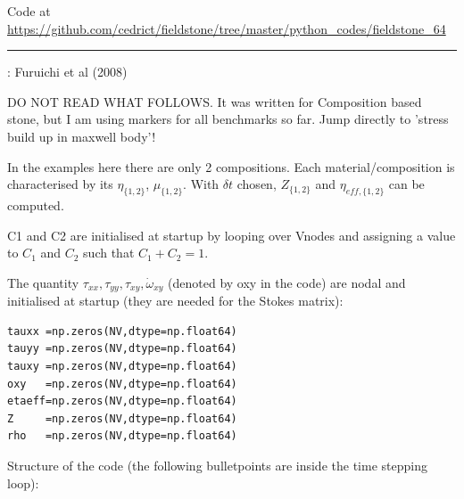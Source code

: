 

\begin{center}
Code at \url{https://github.com/cedrict/fieldstone/tree/master/python_codes/fieldstone_64}
\end{center}

\par\noindent\rule{\textwidth}{0.4pt}

\Literature: Furuichi et al (2008) \cite{fukk08}



{\large
DO NOT READ WHAT FOLLOWS. It was written for Composition based stone, but I am using 
markers for all benchmarks so far. Jump directly to 'stress build up in maxwell body'! 
}

In the examples here there are only 2 compositions. 
Each material/composition is characterised by its $\eta_{\{1,2\}}$, $\mu_{\{1,2\}}$. 
With $\delta t$ chosen, $Z_{\{1,2\}}$ and $\eta_{eff,\{1,2\}}$ can be computed.

C1 and C2 are initialised at startup by looping over Vnodes and assigning a value to $C_1$ 
and $C_2$ such that $C_1+C_2=1$. 

The quantity $\tau_{xx},\tau_{yy},\tau_{xy},\dot{\omega}_{xy}$ (denoted by oxy in the code) 
are nodal and initialised at startup
(they are needed for the Stokes matrix):
\begin{lstlisting}
tauxx =np.zeros(NV,dtype=np.float64)  
tauyy =np.zeros(NV,dtype=np.float64)  
tauxy =np.zeros(NV,dtype=np.float64)  
oxy   =np.zeros(NV,dtype=np.float64)  
etaeff=np.zeros(NV,dtype=np.float64)  
Z     =np.zeros(NV,dtype=np.float64)  
rho   =np.zeros(NV,dtype=np.float64)  
\end{lstlisting}

Structure of the code (the following bulletpoints are inside the time stepping loop):

